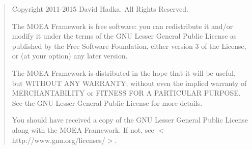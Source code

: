 \begin{quotation}
\noindent
Copyright 2011-2015 David Hadka.  All Rights Reserved.

\vspace{1em}
\noindent
The MOEA Framework is free software: you can redistribute it and/or modify
it under the terms of the GNU Lesser General Public License as published by 
the Free Software Foundation, either version 3 of the License, or (at your 
option) any later version.

\vspace{1em}
\noindent
The MOEA Framework is distributed in the hope that it will be useful, but 
WITHOUT ANY WARRANTY; without even the implied warranty of MERCHANTABILITY 
or FITNESS FOR A PARTICULAR PURPOSE.  See the GNU Lesser General Public 
License for more details.

\vspace{1em}
\noindent
You should have received a copy of the GNU Lesser General Public License 
along with the MOEA Framework.  If not, see $<$http://www.gnu.org/licenses/$>$.
\end{quotation}
